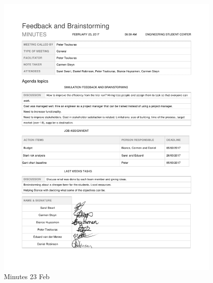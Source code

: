 \begin{appendices}
\begin{figure}[H]
\centering
\includegraphics[scale=0.25]{Meeting_minutes_23_Feb.png}
\caption{Minutes 23 Feb}
\end{figure}


\end{appendices}
